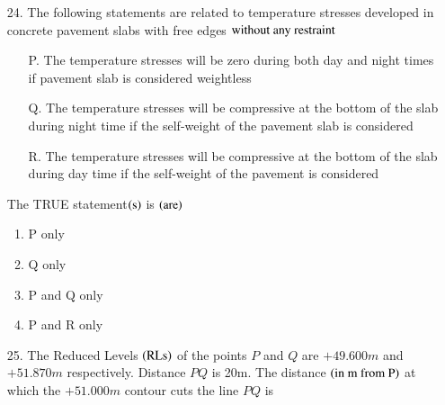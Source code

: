 \documentclass[journal,12pt,onecolumn]{IEEEtran}
\theoremstyle{remark}
\begin{document}
\begin{enumerate}
\begin{multicols}{4}
            \begin{enumerate}
                \item  0.10 \columnbreak
                \item  0.20 \columnbreak
                \item  0.25  \columnbreak
                \item  0.33
            \end{enumerate}
        \end{multicols}
    \item[24.] The following statements are related to temperature stresses developed in concrete 
        pavement slabs with free edges $\textnormal{without any restraint}$
        \begin{enumerate}
            \item[P.] The temperature stresses will be zero during both day and night times if
                pavement slab is considered weightless
            \item[Q.] The temperature stresses will be compressive at the bottom of the slab during night
                time if the self-weight of the pavement slab is considered
            \item[R.] The temperature stresses will be compressive at the bottom of the slab during day time
                if the self-weight of the pavement is considered 
        \end{enumerate}
        The TRUE statement$\left(\textnormal{s}\right)$ is $\left(\textnormal{are}\right)$ 
        \hfill{}
        \begin{multicols}{4}
            \begin{enumerate}
                \item  P only \columnbreak
                \item  Q only \columnbreak
                \item  P and Q only  \columnbreak
                \item  P and R only
            \end{enumerate}
        \end{multicols}  
    \item[25.] The Reduced Levels $\left(\textnormal{RLs}\right)$ of the points $P$ and $Q$ are $+49.600m$ and 
        $+51.870m$ respectively. Distance $PQ$ is 20m. The distance $\left(\textnormal{in m from P}\right)$
        at which the $+51.000m$ contour cuts the line $PQ$ is
        \hfill{}
        \begin{multicols}{4}


\end{multicols}
\end{enumerate}
\end{document}
